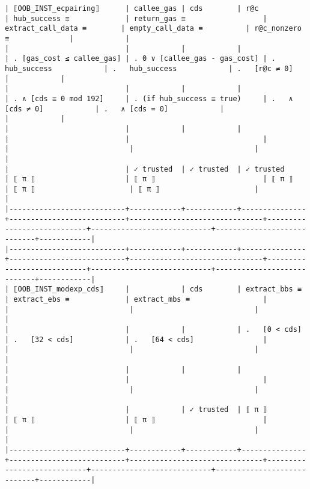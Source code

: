 \documentclass[varwidth=\maxdimen,margin=0.5cm,multi={verbatim}]{standalone}
\begin{document}
\begin{verbatim}
| ⟦OOB_INST_ecpairing⟧      | callee_gas | cds        | r@c           | hub_success ≡             | return_gas ≡                  | extract_call_data ≡        | empty_call_data ≡          | r@c_nonzero ≡              |            |
|                           |            |            |               | . [gas_cost ≤ callee_gas] | . 0 ∨ [callee_gas - gas_cost] | .   hub_success            | .   hub_success            | .   [r@c ≠ 0]              |            |
|                           |            |            |               | . ∧ [cds ≡ 0 mod 192]     | . (if hub_success ≡ true)     | .   ∧ [cds ≠ 0]            | .   ∧ [cds = 0]            |                            |            |
|                           |            |            |               |                           |                               |                            |                            |                            |            |
|                           | ✓ trusted  | ✓ trusted  | ✓ trusted     | ⟦ π ⟧                     | ⟦ π ⟧                         | ⟦ π ⟧                      | ⟦ π ⟧                      | ⟦ π ⟧                      |            |
|---------------------------+------------+------------+---------------+---------------------------+-------------------------------+----------------------------+----------------------------+----------------------------+------------|
|---------------------------+------------+------------+---------------+---------------------------+-------------------------------+----------------------------+----------------------------+----------------------------+------------|
| ⟦OOB_INST_modexp_cds⟧     |            | cds        | extract_bbs ≡ | extract_ebs ≡             | extract_mbs ≡                 |                            |                            |                            |            |
|                           |            |            | .   [0 < cds] | .   [32 < cds]            | .   [64 < cds]                |                            |                            |                            |            |
|                           |            |            |               |                           |                               |                            |                            |                            |            |
|                           |            | ✓ trusted  | ⟦ π ⟧         | ⟦ π ⟧                     | ⟦ π ⟧                         |                            |                            |                            |            |
|---------------------------+------------+------------+---------------+---------------------------+-------------------------------+----------------------------+----------------------------+----------------------------+------------|

\end{verbatim}
\end{document}
